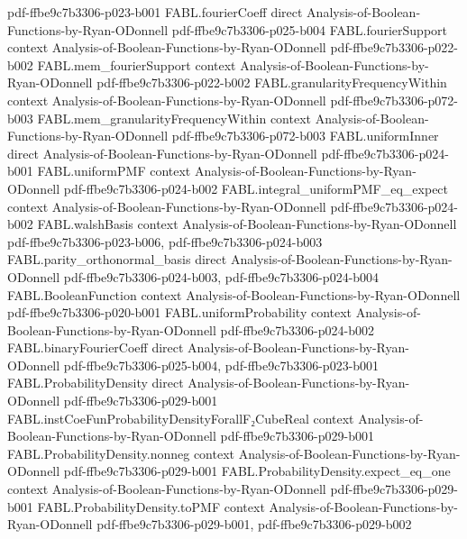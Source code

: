 \begin{theorem}
  {pdf-ffbe9c7b3306-p023-b001}
\proofstep
  {FABL.fourierCoeff}
  {direct}
  {Analysis-of-Boolean-Functions-by-Ryan-ODonnell}
  {pdf-ffbe9c7b3306-p025-b004}
\proofstep
  {FABL.fourierSupport}
  {context}
  {Analysis-of-Boolean-Functions-by-Ryan-ODonnell}
  {pdf-ffbe9c7b3306-p022-b002}
\proofstep
  {FABL.mem_fourierSupport}
  {context}
  {Analysis-of-Boolean-Functions-by-Ryan-ODonnell}
  {pdf-ffbe9c7b3306-p022-b002}
\proofstep
  {FABL.granularityFrequencyWithin}
  {context}
  {Analysis-of-Boolean-Functions-by-Ryan-ODonnell}
  {pdf-ffbe9c7b3306-p072-b003}
\proofstep
  {FABL.mem_granularityFrequencyWithin}
  {context}
  {Analysis-of-Boolean-Functions-by-Ryan-ODonnell}
  {pdf-ffbe9c7b3306-p072-b003}
\proofstep
  {FABL.uniformInner}
  {direct}
  {Analysis-of-Boolean-Functions-by-Ryan-ODonnell}
  {pdf-ffbe9c7b3306-p024-b001}
\proofstep
  {FABL.uniformPMF}
  {context}
  {Analysis-of-Boolean-Functions-by-Ryan-ODonnell}
  {pdf-ffbe9c7b3306-p024-b002}
\proofstep
  {FABL.integral_uniformPMF_eq_expect}
  {context}
  {Analysis-of-Boolean-Functions-by-Ryan-ODonnell}
  {pdf-ffbe9c7b3306-p024-b002}
\proofstep
  {FABL.walshBasis}
  {context}
  {Analysis-of-Boolean-Functions-by-Ryan-ODonnell}
  {pdf-ffbe9c7b3306-p023-b006,
    pdf-ffbe9c7b3306-p024-b003}
\proofstep
  {FABL.parity_orthonormal_basis}
  {direct}
  {Analysis-of-Boolean-Functions-by-Ryan-ODonnell}
  {pdf-ffbe9c7b3306-p024-b003,
    pdf-ffbe9c7b3306-p024-b004}
\proofstep
  {FABL.BooleanFunction}
  {context}
  {Analysis-of-Boolean-Functions-by-Ryan-ODonnell}
  {pdf-ffbe9c7b3306-p020-b001}
\proofstep
  {FABL.uniformProbability}
  {context}
  {Analysis-of-Boolean-Functions-by-Ryan-ODonnell}
  {pdf-ffbe9c7b3306-p024-b002}
\proofstep
  {FABL.binaryFourierCoeff}
  {direct}
  {Analysis-of-Boolean-Functions-by-Ryan-ODonnell}
  {pdf-ffbe9c7b3306-p025-b004,
    pdf-ffbe9c7b3306-p023-b001}
\proofstep
  {FABL.ProbabilityDensity}
  {direct}
  {Analysis-of-Boolean-Functions-by-Ryan-ODonnell}
  {pdf-ffbe9c7b3306-p029-b001}
\proofstep
  {FABL.instCoeFunProbabilityDensityForallF₂CubeReal}
  {context}
  {Analysis-of-Boolean-Functions-by-Ryan-ODonnell}
  {pdf-ffbe9c7b3306-p029-b001}
\proofstep
  {FABL.ProbabilityDensity.nonneg}
  {context}
  {Analysis-of-Boolean-Functions-by-Ryan-ODonnell}
  {pdf-ffbe9c7b3306-p029-b001}
\proofstep
  {FABL.ProbabilityDensity.expect_eq_one}
  {context}
  {Analysis-of-Boolean-Functions-by-Ryan-ODonnell}
  {pdf-ffbe9c7b3306-p029-b001}
\proofstep
  {FABL.ProbabilityDensity.toPMF}
  {context}
  {Analysis-of-Boolean-Functions-by-Ryan-ODonnell}
  {pdf-ffbe9c7b3306-p029-b001,
    pdf-ffbe9c7b3306-p029-b002}

\end{theorem}
